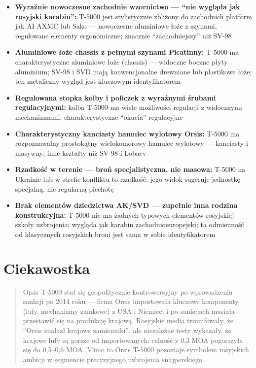 \documentclass[12pt,openany,oneside]{book}
\providecommand{\tightlist}{%
  \setlength{\itemsep}{0pt}\setlength{\parskip}{0pt}}
\begin{document}
\begin{itemize}
\tightlist
\item
  \textbf{Wyraźnie nowoczesne zachodnie wzornictwo --- ``nie wygląda jak
  rosyjski karabin'':} T-5000 jest stylistycznie zbliżony do zachodnich
  platform jak AI AXMC lub Sako --- nowoczesne aluminiowe łoże z
  szynami, regulowane elementy ergonomiczne; znacznie ``zachodniejszy''
  niż SV-98
\item
  \textbf{Aluminiowe łoże chassis z pełnymi szynami Picatinny:} T-5000
  ma charakterystyczne aluminiowe łoże (chassis) --- widoczne boczne
  płyty aluminium; SV-98 i SVD mają konwencjonalne drewniane lub
  plastikowe łoże; ten metaliczny wygląd jest kluczowym identyfikatorem
\item
  \textbf{Regulowana stopka kolby i policzek z wyraźnymi śrubami
  regulacyjnymi:} kolba T-5000 ma wiele możliwości regulacji z
  widocznymi mechanizmami; charakterystyczne ``okucia'' regulacyjne
\item
  \textbf{Charakterystyczny kanciasty hamulec wylotowy Orsis:} T-5000 ma
  rozpoznawalny prostokątny wielokomorowy hamulec wylotowy --- kanciasty
  i masywny; inne kształty niż SV-98 i Lobaev
\item
  \textbf{Rzadkość w terenie --- broń specjalistyczna, nie masowa:}
  T-5000 na Ukrainie lub w strefie konfliktu to rzadkość; jego widok
  sugeruje jednostkę specjalną, nie regularną piechotę
\item
  \textbf{Brak elementów dziedzictwa AK/SVD --- zupełnie inna rodzina
  konstrukcyjna:} T-5000 nie ma żadnych typowych elementów rosyjskiej
  szkoły uzbrojenia; wygląda jak karabin zachodnioeuropejski; ta
  odmienność od klasycznych rosyjskich broni jest sama w sobie
  identyfikatorem
\end{itemize}

\section{Ciekawostka}\label{ciekawostka-64}

\begin{quote}
Orsis T-5000 stał się geopolitycznie kontrowersyjny po wprowadzeniu
sankcji po 2014 roku --- firma Orsis importowała kluczowe komponenty
(lufy, mechanizmy zamkowe) z USA i Niemiec, i po sankcjach musiała
przestawić się na produkcję krajową. Rosyjskie media triumfowały, że
``Orsis znalazł krajowe zamienniki'', ale niezależne testy wykazały, że
krajowe lufy są gorsze od importowanych; celność z 0,3 MOA pogorszyła
się do 0,5--0,6 MOA. Mimo to Orsis T-5000 pozostaje symbolem rosyjskich
ambicji w segmencie precyzyjnego uzbrojenia snajperskiego.
\end{quote}
\end{document}
